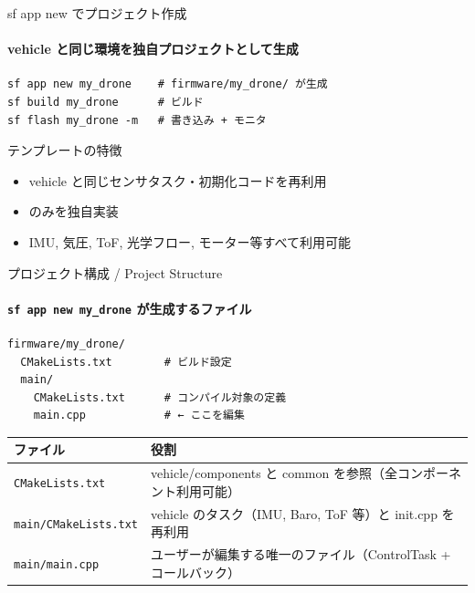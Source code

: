 \documentclass[aspectratio=169, 14pt]{beamer}
\begin{document}
\begin{frame}[fragile]{sf app new でプロジェクト作成}
  \framesubtitle{vehicle と同じ環境を独自プロジェクトとして生成}
  \begin{lstlisting}[style=sfbash]
sf app new my_drone    # firmware/my_drone/ が生成
sf build my_drone      # ビルド
sf flash my_drone -m   # 書き込み + モニタ
  \end{lstlisting}

  \vspace{0.5em}

  \begin{block}{テンプレートの特徴}
    \begin{itemize}
      \item vehicle と同じセンサタスク・初期化コードを再利用
      \item {} のみを独自実装
      \item IMU, 気圧, ToF, 光学フロー, モーター等すべて利用可能
    \end{itemize}
  \end{block}
\end{frame}

\begin{frame}[fragile]{プロジェクト構成 / Project Structure}
  \framesubtitle{\texttt{sf app new my\_drone} が生成するファイル}
  \begin{lstlisting}[style=sfbash, basicstyle=\ttfamily\small]
firmware/my_drone/
  CMakeLists.txt        # ビルド設定
  main/
    CMakeLists.txt      # コンパイル対象の定義
    main.cpp            # ← ここを編集
  \end{lstlisting}

  \vspace{0.3em}

  {\footnotesize
  \begin{tabular}{ll}
    \hline
    \textbf{ファイル} & \textbf{役割} \\
    \hline
    \texttt{CMakeLists.txt}      & vehicle/components と common を参照（全コンポーネント利用可能） \\
    \texttt{main/CMakeLists.txt} & vehicle のタスク（IMU, Baro, ToF 等）と init.cpp を再利用 \\
    \texttt{main/main.cpp}       & ユーザーが編集する唯一のファイル（ControlTask + コールバック） \\
    \hline
  \end{tabular}
  }
\end{frame}
\end{document}
